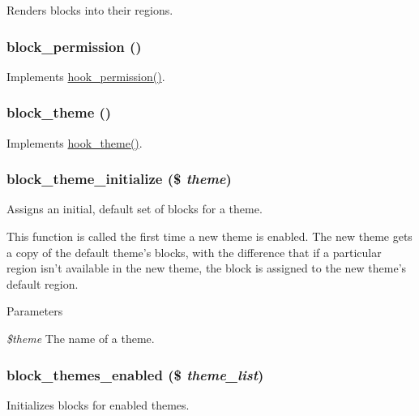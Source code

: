 Renders blocks into their regions. \hypertarget{block_8module_a41b263bbd3c2a8be0790bf1a11c3e04d}{
\subsubsection[{block\_\-permission}]{\setlength{\rightskip}{0pt plus 5cm}block\_\-permission ()}}
\label{block_8module_a41b263bbd3c2a8be0790bf1a11c3e04d}
Implements \hyperlink{group__hooks_ga2b22b45f4925f2478412477bae329713}{hook\_\-permission()}. \hypertarget{block_8module_a1bd427b94fa44c9a985d768adc2d190e}{
\subsubsection[{block\_\-theme}]{\setlength{\rightskip}{0pt plus 5cm}block\_\-theme ()}}
\label{block_8module_a1bd427b94fa44c9a985d768adc2d190e}
Implements \hyperlink{group__hooks_ga013ccb45c7aaab1c16cf9691428c910d}{hook\_\-theme()}. \hypertarget{block_8module_a0636648d3f8f3e32a8fb37becc70cbff}{
\subsubsection[{block\_\-theme\_\-initialize}]{\setlength{\rightskip}{0pt plus 5cm}block\_\-theme\_\-initialize (\$ {\em theme})}}
\label{block_8module_a0636648d3f8f3e32a8fb37becc70cbff}
Assigns an initial, default set of blocks for a theme.

This function is called the first time a new theme is enabled. The new theme gets a copy of the default theme's blocks, with the difference that if a particular region isn't available in the new theme, the block is assigned to the new theme's default region.


\begin{DoxyParams}{Parameters}
\item[{\em \$theme}]The name of a theme. \end{DoxyParams}
\hypertarget{block_8module_a86c6b09110f9a12b4c166e8a1cea05ef}{
\subsubsection[{block\_\-themes\_\-enabled}]{\setlength{\rightskip}{0pt plus 5cm}block\_\-themes\_\-enabled (\$ {\em theme\_\-list})}}
\label{block_8module_a86c6b09110f9a12b4c166e8a1cea05ef}
Initializes blocks for enabled themes.


